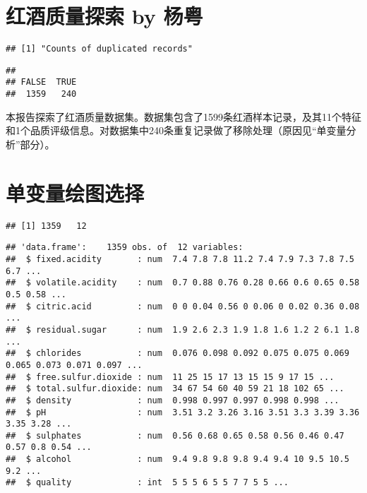 \documentclass[]{article}
\title{}
\author{}
\date{}
\begin{document}
\section{红酒质量探索 by 杨粤}\label{-by-}

\begin{verbatim}
## [1] "Counts of duplicated records"
\end{verbatim}

\begin{verbatim}
## 
## FALSE  TRUE 
##  1359   240
\end{verbatim}

本报告探索了红酒质量数据集。数据集包含了1599条红酒样本记录，及其11个特征和1个品质评级信息。对数据集中240条重复记录做了移除处理（原因见``单变量分析''部分）。

\section{单变量绘图选择}

\begin{verbatim}
## [1] 1359   12
\end{verbatim}

\begin{verbatim}
## 'data.frame':    1359 obs. of  12 variables:
##  $ fixed.acidity       : num  7.4 7.8 7.8 11.2 7.4 7.9 7.3 7.8 7.5 6.7 ...
##  $ volatile.acidity    : num  0.7 0.88 0.76 0.28 0.66 0.6 0.65 0.58 0.5 0.58 ...
##  $ citric.acid         : num  0 0 0.04 0.56 0 0.06 0 0.02 0.36 0.08 ...
##  $ residual.sugar      : num  1.9 2.6 2.3 1.9 1.8 1.6 1.2 2 6.1 1.8 ...
##  $ chlorides           : num  0.076 0.098 0.092 0.075 0.075 0.069 0.065 0.073 0.071 0.097 ...
##  $ free.sulfur.dioxide : num  11 25 15 17 13 15 15 9 17 15 ...
##  $ total.sulfur.dioxide: num  34 67 54 60 40 59 21 18 102 65 ...
##  $ density             : num  0.998 0.997 0.997 0.998 0.998 ...
##  $ pH                  : num  3.51 3.2 3.26 3.16 3.51 3.3 3.39 3.36 3.35 3.28 ...
##  $ sulphates           : num  0.56 0.68 0.65 0.58 0.56 0.46 0.47 0.57 0.8 0.54 ...
##  $ alcohol             : num  9.4 9.8 9.8 9.8 9.4 9.4 10 9.5 10.5 9.2 ...
##  $ quality             : int  5 5 5 6 5 5 7 7 5 5 ...
\end{verbatim}
\end{document}
